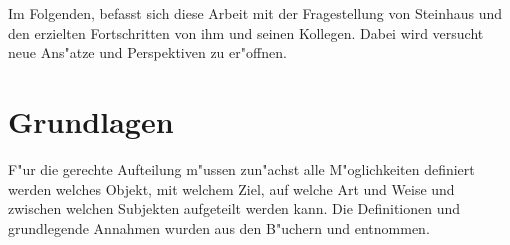 \documentclass[11pt, a4paper, twoside]{article}
\numberwithin{equation}{section}
\begin{document}
Im Folgenden, befasst sich diese Arbeit mit der Fragestellung von Steinhaus und den erzielten Fortschritten von ihm und seinen Kollegen. Dabei wird versucht neue Ans"atze und Perspektiven zu er"offnen.
\newpage
\section{Grundlagen}
F"ur die gerechte Aufteilung m"ussen zun"achst alle M"oglichkeiten definiert werden welches Objekt, mit welchem Ziel, auf welche Art und Weise und zwischen welchen Subjekten aufgeteilt werden kann. Die Definitionen und grundlegende Annahmen wurden aus den B"uchern \cite{26} und \cite{27} entnommen.
\end{document}
